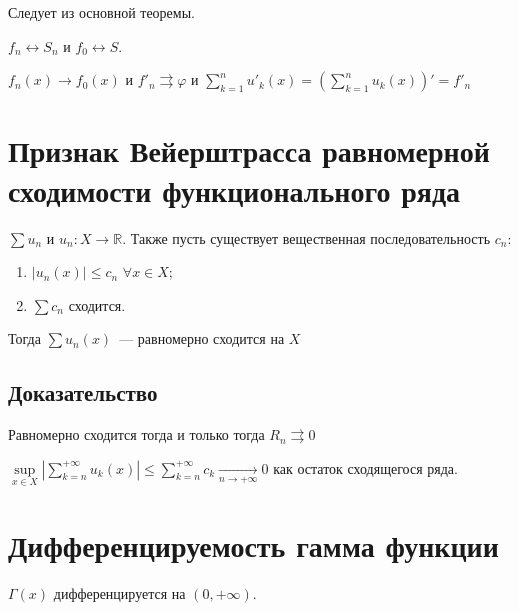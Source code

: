 \documentclass{article}
\begin{document}
            Следует из основной теоремы.
                
            $f_n \leftrightarrow S_n$ и $f_0 \leftrightarrow S$.
                
            $f_n(x) \rightarrow f_0(x)$ и $f'_n \rightrightarrows \varphi$ и $\sum\limits^n_{k = 1} u'_k(x) = \left( \sum\limits^n_{k = 1} u_k(x) \right)' = f'_n$
                
    \newpage
    
    \section{Признак Вейерштрасса равномерной сходимости функционального ряда}
    
        $\sum u_n$ и $u_n : X \rightarrow \mathbb{R}$. Также пусть существует вещественная последовательность $c_n$:
        
        \begin{enumerate}
        
            \item $| u_n(x) | \leqslant c_n$ $\forall x \in X$;
            
            \item $\sum c_n$ сходится.
            
        \end{enumerate}
        
        Тогда $\sum u_n(x)$~--- равномерно сходится на $X$
        
        \subsection{Доказательство}
        
            Равномерно сходится тогда и только тогда $R_n \rightrightarrows 0$
            
            $\sup\limits_{x \in X} \left| \sum\limits^{+\infty}_{k = n} u_k(x) \right| \leqslant \sum\limits^{+\infty}_{k = n} c_k \xrightarrow[n \rightarrow +\infty]{} 0$ как остаток сходящегося ряда.
        
    \newpage
    
    \section{Дифференцируемость гамма функции}
    
        $\Gamma(x)$ дифференцируется на $(0, +\infty)$.
        
\end{document}
